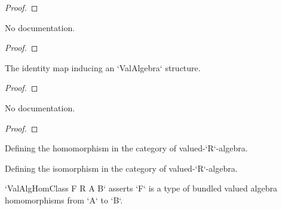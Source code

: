 \begin{proof}
    \leanok
\end{proof}

\begin{theorem}\label{ValAlgebra.val_isEquiv_comap}
        \leanok
                No documentation.
    \end{theorem}

\begin{proof}
    \leanok
\end{proof}

\begin{theorem}\label{ValAlgebra.id.map_eq_id}
        \leanok
                The identity map inducing an `ValAlgebra` structure.
    \end{theorem}

\begin{proof}
    \leanok
\end{proof}

\begin{theorem}\label{ValAlgebra.id.map_eq_self}
        \leanok
                No documentation.
    \end{theorem}

\begin{proof}
    \leanok
\end{proof}

\begin{definition}\label{ValAlgHom}
        \leanok
                Defining the homomorphism in the category of valued-`R`-algebra.
    \end{definition}

\begin{definition}\label{ValAlgEquiv}
        \leanok
                Defining the isomorphism in the category of valued-`R`-algebra.
    \end{definition}

\begin{definition}\label{ValAlgHomClass}
        \leanok
                `ValAlgHomClass F R A B` asserts `F` is a type of bundled valued algebra homomorphisms
from `A` to `B`.
    \end{definition}

